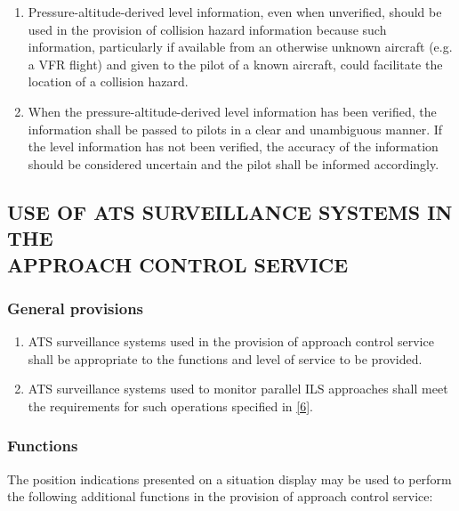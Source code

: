 \begin{enumerate}
    \item Pressure-altitude-derived level information, even when unverified, should be used in the provision of collision hazard information because such information, particularly if available from an otherwise unknown aircraft (e.g. a VFR flight) and given to the pilot of a known aircraft, could facilitate the location of a collision hazard.
    \item When the pressure-altitude-derived level information has been verified, the information shall be passed to pilots in a clear and unambiguous manner. If the level information has not been verified, the accuracy of the information should be considered uncertain and the pilot shall be informed accordingly.
\end{enumerate}


\subsection[Use of ATS surveillance systems in the approach control service]{USE OF ATS SURVEILLANCE SYSTEMS IN THE \\ APPROACH CONTROL SERVICE} \label{8.9}

\subsubsection{General provisions}

\begin{enumerate}
    \item ATS surveillance systems used in the provision of approach control service shall be appropriate to the functions and level of service to be provided.
    \item ATS surveillance systems used to monitor parallel ILS approaches shall meet the requirements for such operations specified in \ref{6}.
\end{enumerate}

\subsubsection{Functions}

The position indications presented on a situation display may be used to perform the following additional functions in the provision of approach control service:

